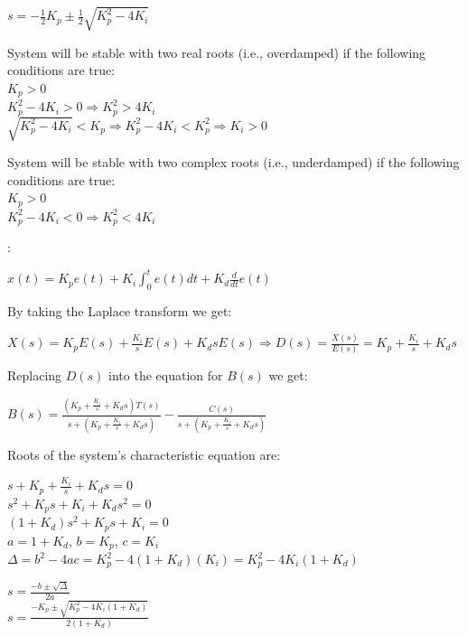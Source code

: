 \documentclass{article}
\begin{document}
\begin{enumerate}
\begin{itemize}
\noindent $s = -{\frac{1}{2}}K_p \pm {\frac{1}{2}} \sqrt{K_p^2 -
4K_i}$ \bigbreak

\noindent System will be stable with two real roots (i.e., overdamped) if the
following conditions are true:\\
\noindent $K_p > 0$\\
\noindent $K_p^2 - 4K_i > 0 \Rightarrow K_p^2 > 4K_i$\\
\noindent $\sqrt{K_p^2 - 4K_i} < K_p \Rightarrow K_p^2 - 4K_i <
K_p^2 \Rightarrow K_i > 0$ \bigbreak

\noindent System will be stable with two complex roots (i.e., underdamped) if the
following conditions are true:\\
\noindent $K_p > 0$\\
\noindent $K_p^2 - 4K_i < 0 \Rightarrow K_p^2 < 4K_i$

\bigbreak \bigbreak

: \smallbreak

\noindent $x(t) = K_p e(t) + K_i \int^t_0 e(t) dt + K_d
{\frac{d}{dt}} e(t)$ \bigbreak

\noindent By taking the Laplace transform we get: \smallbreak

\noindent $X(s) = K_p E(s) + {\frac{K_i}{s}} E(s) + K_d s E(s)
\Rightarrow D(s) = {\frac{X(s)}{E(s)}} = K_p + {\frac{K_i}{s}} +
K_d s$ \bigbreak

\noindent Replacing $D(s)$ into the equation for $B(s)$ we get:
\smallbreak

\noindent $B(s) = {\frac{(K_p + {\frac{K_i}{s}} + K_d s) T(s)}{s +
(K_p + {\frac{K_i}{s}} + K_d s)}} - {\frac{C(s)}{s + (K_p +
{\frac{K_i}{s}} + K_d s)}}$ \bigbreak

\noindent Roots of the system's characteristic equation are:
\smallbreak

\noindent $s + K_p + {\frac{K_i}{s}} + K_d s = 0$\\
\noindent $s^2 + K_ps + K_i + K_d s^2 = 0$\\
\noindent $(1+K_d)s^2 + K_p s + K_i = 0$\\
\noindent $a = 1+K_d$, $b = K_p$, $c = K_i$\\
\noindent $\Delta = b^2 - 4ac = K_p^2 - 4(1+K_d)(K_i) = K_p^2 - 4
K_i(1+K_d)$ \bigbreak

\noindent $s = {\frac{-b \pm \sqrt{\Delta}}{2a}}$\\

\noindent $s = {\frac{-K_p \pm \sqrt{K_p^2 - 4K_i(1+K_d)}}{2(1+K_d)}}$\\


\end{itemize}
\end{enumerate}
\end{document}
